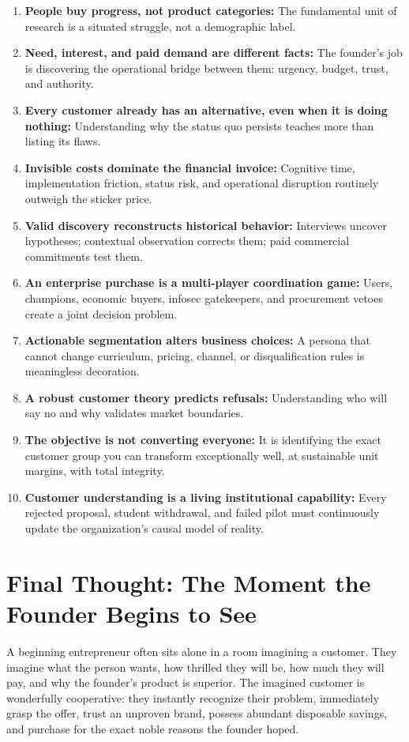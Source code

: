 \begin{enumerate}[leftmargin=1.4em,itemsep=0.4ex]
  \item \textbf{People buy progress, not product categories:} The fundamental unit of research is a situated struggle, not a demographic label.
  \item \textbf{Need, interest, and paid demand are different facts:} The founder's job is discovering the operational bridge between them: urgency, budget, trust, and authority.
  \item \textbf{Every customer already has an alternative, even when it is doing nothing:} Understanding why the status quo persists teaches more than listing its flaws.
  \item \textbf{Invisible costs dominate the financial invoice:} Cognitive time, implementation friction, status risk, and operational disruption routinely outweigh the sticker price.
  \item \textbf{Valid discovery reconstructs historical behavior:} Interviews uncover hypotheses; contextual observation corrects them; paid commercial commitments test them.
  \item \textbf{An enterprise purchase is a multi-player coordination game:} Users, champions, economic buyers, infosec gatekeepers, and procurement vetoes create a joint decision problem.
  \item \textbf{Actionable segmentation alters business choices:} A persona that cannot change curriculum, pricing, channel, or disqualification rules is meaningless decoration.
  \item \textbf{A robust customer theory predicts refusals:} Understanding who will say no and why validates market boundaries.
  \item \textbf{The objective is not converting everyone:} It is identifying the exact customer group you can transform exceptionally well, at sustainable unit margins, with total integrity.
  \item \textbf{Customer understanding is a living institutional capability:} Every rejected proposal, student withdrawal, and failed pilot must continuously update the organization's causal model of reality.
\end{enumerate}

\section*{Final Thought: The Moment the Founder Begins to See}

A beginning entrepreneur often sits alone in a room imagining a customer. They imagine what the person wants, how thrilled they will be, how much they will pay, and why the founder's product is superior. The imagined customer is wonderfully cooperative: they instantly recognize their problem, immediately grasp the offer, trust an unproven brand, possess abundant disposable savings, and purchase for the exact noble reasons the founder hoped.

